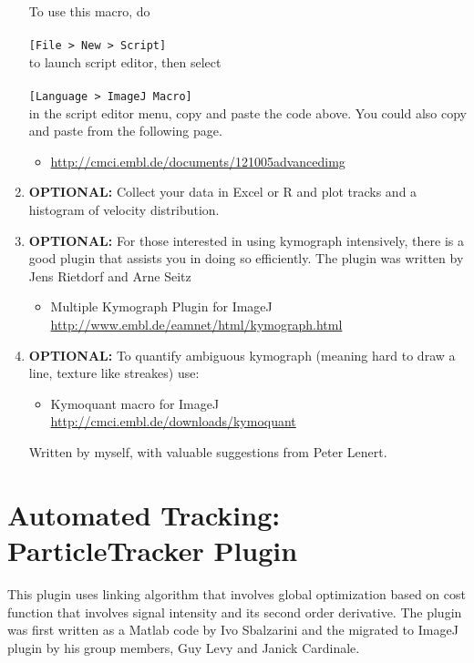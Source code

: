 \documentclass[11pnt]{article}
\begin{document}
\begin{enumerate}
To use this macro, do 
\\
\\
\verb"[File > New > Script]"
\\
to launch script editor, then select 
\\
\\
\verb"[Language > ImageJ Macro]" 
\\
in the script editor menu, copy and paste the code above. You could also copy and paste from the following page. 
\begin{itemize}
\item \url{http://cmci.embl.de/documents/121005advancedimg}
\end{itemize}

\item \textbf{OPTIONAL:} Collect your data in Excel or R and plot tracks and a histogram of velocity distribution.


\item \textbf{OPTIONAL:} For those interested in using kymograph intensively, there is a good plugin that assists you in doing so efficiently. The plugin was written by Jens Rietdorf and Arne Seitz
\begin{itemize}
\item Multiple Kymograph Plugin for ImageJ\\  \url{http://www.embl.de/eamnet/html/kymograph.html}
\end{itemize}

\item \textbf{OPTIONAL:} To quantify ambiguous kymograph (meaning hard to draw a line, texture like streakes) use:
\begin{itemize}
\item Kymoquant macro for ImageJ\\ \url{http://cmci.embl.de/downloads/kymoquant}
\end{itemize}
Written by myself, with valuable suggestions from Peter Lenert. 

\end{enumerate}

\section{Automated Tracking: ParticleTracker Plugin}

This plugin uses linking algorithm that involves global optimization based on cost function that involves signal intensity and its second order derivative. The plugin was first written as a Matlab code by Ivo Sbalzarini and the migrated to ImageJ plugin by his group members, Guy Levy and Janick Cardinale.
\end{document}
